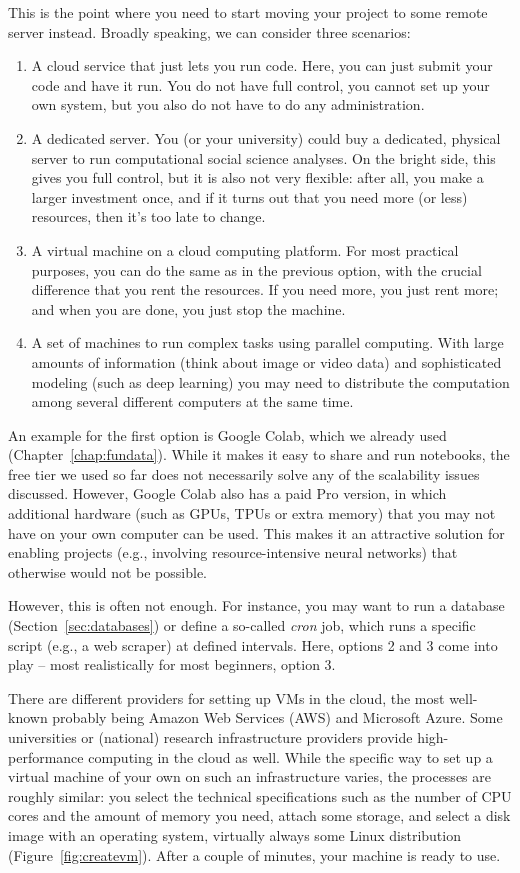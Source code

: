 This is the point where you need to start moving your project to some
remote server instead. Broadly speaking, we can consider three
scenarios:
\begin{enumerate}
\item A cloud service that just lets you run code. Here, you can just
  submit your code and have it run. You do not have full control, you
  cannot set up your own system, but you also do not have to do any
  administration.
\item A dedicated server. You (or your university) could buy a
  dedicated, physical server to run computational social science
  analyses. On the bright side, this gives you full control, but it is
  also not very flexible: after all, you make a larger investment
  once, and if it turns out that you need more (or less) resources,
  then it's too late to change.
\item A virtual machine on a cloud computing platform. For most
  practical purposes, you can do the same as in the previous option,
  with the crucial difference that you rent the resources. If you need
  more, you just rent more; and when you are done, you just stop the
  machine.
\item A set of machines to run complex tasks using parallel computing. With large amounts of information (think about image or video data) and sophisticated modeling (such as deep learning) you may need to distribute the computation among several different computers at the same time.
\end{enumerate}

An example for the first option is Google Colab, which we already used
(Chapter~\ref{chap:fundata}). While it makes it easy to share and run notebooks,
the free tier we used so far does not necessarily solve any of the
scalability issues discussed. However, Google Colab also has a paid Pro
version, in which additional hardware (such as GPUs, TPUs or extra memory)
that you may not have on your own computer can be used. This makes
it an attractive solution for enabling projects (e.g., involving
resource-intensive neural networks) that otherwise would not be possible.

However, this is often not enough. For instance, you may want to run
a database (Section~\ref{sec:databases}) or define a so-called \emph{cron} job,
which runs a specific script (e.g., a web scraper) at defined intervals.
Here, options 2 and 3 come into play -- most realistically for most
beginners, option 3.

There are different providers for setting up VMs in the cloud, the
most well-known probably being Amazon Web Services (AWS) and
Microsoft Azure. Some universities or (national) research infrastructure
providers provide high-performance computing in the cloud as well.
While the specific way to set up a virtual machine of your own on
such an infrastructure varies, the processes are roughly similar:
you select the technical specifications such as the number of CPU
cores and the amount of memory you need, attach some storage, and
select a disk image with an operating system, virtually always some
Linux distribution (Figure~\ref{fig:createvm}).
After a couple of minutes, your machine is ready to use.

